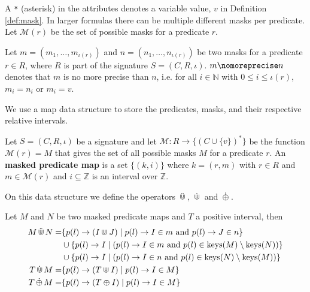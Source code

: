 A \texttt{*} (asterisk) in the attributes denotes a variable value, $v$ in Definition \ref{def:mask}.
In larger formulas there can be multiple different masks per predicate.
Let $\mathcal{M}(r)$ be the set of possible masks for a predicate $r$.

\begin{definition}
    \label{def:mask-precision-comparison}
    Let $m = (m_1, \dots, m_{\iota(r)})$ and $n = (n_1, \dots, n_{\iota(r)})$ be two masks for a predicate $r \in R$, where $R$ is part of the signature $S = (C,R,\iota)$.
    $m \nomoreprecise n$ denotes that $m$ is no more precise than $n$, i.e. for all $i \in \mathbb{N}$ with $0 \leq i \leq \iota(r)$, $m_i = n_i$ or $m_i = v$.
\end{definition}

We use a map data structure to store the predicates, masks, and their respective relative intervals.

\begin{definition}
    \label{def:map}
    Let $S=(C,R,\iota)$ be a signature and let $\mathcal{M} : R \to \{(C \cup \{v\})^*\}$ be the function $\mathcal{M}(r) = M$ that gives the set of all possible masks $M$ for a predicate $r$.
    An \textbf{masked predicate map} is a set $\{(k,i)\}$ where $k = (r,m)$ with $r \in R$ and $m \in \mathcal{M}(r)$ and $i \subseteq \mathbb{Z}$ is an interval over $\mathbb{Z}$. 
\end{definition}


On this data structure we define the operators $\,\ddot{\Cup}\,$, $\,\dot{\Cup}\,$ and $\,\dot{\oplus}\,$.

\begin{definition}
    \label{def:e-rel-int-ops}
    Let $M$ and $N$ be two masked predicate maps and $T$ a positive interval, then 
    \begin{align*}
        M \,\ddot{\Cup}\, N = 
            & \{ p(l) \rightarrow (I \Cup J) \mid 
                p(l) \rightarrow I \in m \text{ and } 
                p(l) \rightarrow J \in n \} \\
            & \cup \{p(l) \rightarrow I \mid  
                (p(l) \rightarrow I \in m \text{ and }
                p(l) \in \operatorname{keys}(M) \setminus \operatorname{keys}(N)) \} \\
            & \cup \{p(l) \rightarrow I \mid  
                (p(l) \rightarrow I \in n \text{ and }
                p(l) \in \operatorname{keys}(N) \setminus \operatorname{keys}(M))
                \}        
                \\
        T \,\dot{\Cup}\, M = 
            & \{ p(l) \rightarrow (T \Cup I) \mid 
                p(l) \rightarrow I \in M \} \\
        T \,\dot{\oplus}\, M = 
            & \{ p(l) \rightarrow (T \oplus I) \mid 
                p(l) \rightarrow I \in M \} \\
    \end{align*}
\end{definition}


